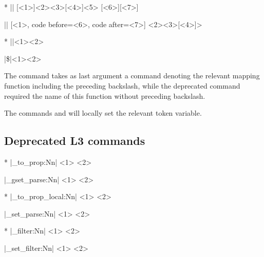 \documentclass[a4paper]{article}
\begin{document}
{{\begin{macrodeprecated}*
|\JSONParseArrayValuesMap|
  [<1>]{<2>}{<3>}[<4>]{<5>}
  [<6>][<7>]
\end{macrodeprecated}
\hfill
\begin{macroreplacement}
|\JSONParseArrayMapFunction|
  [<1>, code before={<6>},
    code after={<7>}]
  {<2>}{<3>}[<4>]{>}
\end{macroreplacement}

\begin{macrodeprecated}*
|\x|{<1>}{<2>}
\end{macrodeprecated}
\hfill
\begin{macroreplacement}
|\$|{<1>}{<2>}
\end{macroreplacement}

The command \macro{\JSONParseArrayMapFunction} takes as last argument a command denoting the relevant mapping function including the preceding backslash, while the deprecated command \macro{\JSONParseArrayValuesMap} required the name of this function without preceding backslash.

The commands \macro{\JSONParseSetRescanValue} and \macro{\JSONParseSetKeys} will locally set the relevant token variable.

\subsection{Deprecated L3 commands}

\begin{macrodeprecated}*
|\jsonparse_to_prop:Nn|
  <1> {<2>}
\end{macrodeprecated}
\hfill
\begin{macroreplacement}
|\jsonparse_gset_parse:Nn|
  <1> {<2>}
\end{macroreplacement}

\begin{macrodeprecated}*
|\jsonparse_to_prop_local:Nn|
  <1> {<2>}
\end{macrodeprecated}
\hfill
\begin{macroreplacement}
|\jsonparse_set_parse:Nn|
  <1> {<2>}
\end{macroreplacement}

\begin{macrodeprecated}*
|\jsonparse_filter:Nn|
  <1> {<2>}
\end{macrodeprecated}
\hfill
\begin{macroreplacement}
|\jsonparse_set_filter:Nn|
  <1> {<2>}
\end{macroreplacement}

}}
\end{document}
